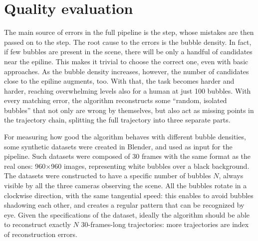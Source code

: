\section{Quality evaluation}

The main source of errors in the full pipeline is the \match* step, whose mistakes are then passed on to the \linkDDD* step.
The root cause to the \match* errors is the bubble density.
In fact, if few bubbles are present in the scene, there will be only a handful of candidates near the epiline.
This makes it trivial to choose the correct one, even with basic approaches.
As the bubble density increases, however, the number of candidates close to the epiline augments, too.
With that, the \match* task becomes harder and harder, reaching overwhelming levels also for a human at just 100 bubbles.
With every matching error, the algorithm reconstructs some ``random, isolated bubbles'' that not only are wrong by themselves, but also act as missing points in the trajectory chain, splitting the full trajectory into three separate parts.


For measuring how good the algorithm behaves with different bubble densities, some synthetic datasets were created in Blender, and used as input for the pipeline.
Such datasets were composed of 30 frames with the same format as the real ones: 960{$\times$}960 images, representing white bubbles over a black background.
The datasets were constructed to have a specific number of bubbles $N$, always visible by all the three cameras observing the scene.
All the bubbles rotate in a clockwise direction, with the same tangential speed: this enables to avoid bubbles shadowing each other, and creates a regular pattern that can be recognized by eye.
Given the specifications of the dataset, ideally the algorithm should be able to reconstruct exactly $N$ 30-frames-long trajectories: more trajectories are index of reconstruction errors.



